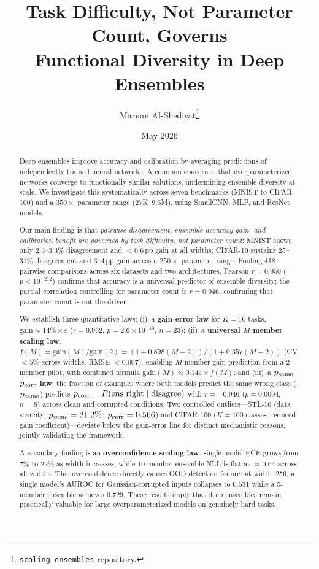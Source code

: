 \documentclass[11pt]{article}
\title{\textbf{Task Difficulty, Not Parameter Count, Governs\\
       Functional Diversity in Deep Ensembles}}
\author{Maruan Al-Shedivat\thanks{%
  \texttt{scaling-ensembles} repository.}}
\date{May 2026}
\begin{document}
\maketitle

\begin{abstract}
Deep ensembles improve accuracy and calibration by averaging predictions of
independently trained neural networks.  A common concern is that
overparameterized networks converge to functionally similar solutions,
undermining ensemble diversity at scale.  We investigate this systematically
across seven benchmarks (MNIST to CIFAR-100) and a $350\times$ parameter
range (27K--9.6M), using SmallCNN, MLP, and ResNet models.

Our main finding is that \emph{pairwise disagreement, ensemble accuracy
gain, and calibration benefit are governed by task difficulty, not parameter
count}: MNIST shows only $2.3$--$3.3\%$ disagreement and $<0.6$\,pp gain
at all widths; CIFAR-10 sustains $25$--$31\%$ disagreement and
$3$--$4$\,pp gain across a $250\times$ parameter range.  Pooling
418 pairwise comparisons across six datasets and two architectures,
Pearson $r = 0.950$ ($p < 10^{-212}$) confirms that accuracy is a
universal predictor of ensemble diversity; the partial correlation
controlling for parameter count is $r = 0.946$, confirming that parameter
count is not the driver.

We establish three quantitative laws: (i)~a \textbf{gain-error law}
for $K\!=\!10$ tasks, $\text{gain} \approx 14\%\times\varepsilon$
($r=0.962$, $p=2.6\times 10^{-13}$, $n=23$); (ii)~a \textbf{universal
$M$-member scaling law}, $f(M)=\mathrm{gain}(M)/\mathrm{gain}(2)=
(1+0.898(M-2))/(1+0.357(M-2))$ (CV $<5\%$ across widths, RMSE $<0.007$),
enabling $M$-member gain prediction from a 2-member pilot, with combined
formula $\mathrm{gain}(M)\approx 0.14\varepsilon\times f(M)$; and
(iii)~a \textbf{$p_{\rm same}$--$p_{\rm corr}$ law}: the fraction of
examples where both models predict the same wrong class ($p_{\rm same}$)
predicts $p_{\rm corr}=P(\text{ens right}\mid\text{disagree})$ with
$r=-0.946$ ($p=0.0004$, $n=8$) across clean and corrupted conditions.
Two controlled outliers---STL-10 (data scarcity; $p_{\rm same}=21.2\%$;
$p_{\rm corr}=0.566$) and CIFAR-100 ($K\!=\!100$ classes;
reduced gain coefficient)---deviate below the gain-error line for distinct
mechanistic reasons, jointly validating the framework.

A secondary finding is an \textbf{overconfidence scaling law}: single-model
ECE grows from $7\%$ to $22\%$ as width increases, while 10-member ensemble
NLL is flat at ${\approx}0.64$ across all widths.  This overconfidence
directly causes OOD detection failure: at width~256, a single model's
AUROC for Gaussian-corrupted inputs collapses to $0.531$ while a 5-member
ensemble achieves $0.729$.  These results imply that deep ensembles remain
practically valuable for large overparameterized models on genuinely hard tasks.
\end{abstract}
\end{document}
